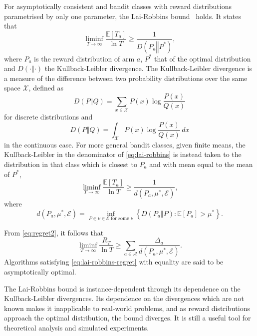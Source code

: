 For asymptotically consistent and bandit classes with reward distributions parametrised by only one parameter, the Lai-Robbins bound~\autocite{lai1985} holds.
It states that
\begin{equation}
    \liminf_{T\to\infty} \frac{\mathbb{E}[T_a]}{\ln T} \geq \frac{1}{D(P_a \mathrel{\Vert} P^*)},
    \label{eq:lai-robbins-times}
\end{equation}
where $P_a$ is the reward distribution of arm $a$, $P^*$ that of the optimal distribution and $D(\cdot \mathrel{\Vert} \cdot)$ the Kullback-Leibler divergence.
The Kullback-Leibler divergence is a measure of the difference between two probability distributions over the same space $\mathcal{X}$, defined as
\begin{equation}
    D(P \mathrel{\Vert} Q) = \sum_{x \in \mathcal{X}} P(x) \log \frac{P(x)}{Q(x)}
\end{equation}
for discrete distributions and
\begin{equation}
    D(P \mathrel{\Vert} Q) = \int_{\mathcal{X}} P(x) \log \frac{P(x)}{Q(x)} \, dx
\end{equation}
in the continuous case.
For more general bandit classes, given finite means, the Kullback-Leibler in the denominator of \cref{eq:lai-robbins} is instead taken to the distribution in that class which is closest to $P_a$ and with mean equal to the mean of $P^*$,
\begin{equation}
    \liminf_{T\to\infty} \frac{\mathbb{E}[T_a]}{\ln T} \geq \frac{1}{d(P_a, \mu^*, \mathcal{E})},
    \label{eq:lai-robbins}
\end{equation}
where
\begin{equation}
    d(P_a, \mu^*, \mathcal{E}) =
    \inf_{P \in \nu \in \mathcal{E} \text{ for some } \nu}
    \left\{ D(P_a \mathrel{\Vert} P): \mathbb{E}[P_a] > \mu^* \right\}.
\end{equation}


From \cref{eq:regret2}, it follows that
\begin{equation}
    \liminf_{T\to\infty} \frac{R_T}{\ln T}
    \geq
    \sum_{a \in \mathcal{A}}\frac{\Delta_a}{d(P_a, \mu^*, \mathcal{E})}.
    \label{eq:lai-robbins-regret}
\end{equation}
Algorithms satisfying \cref{eq:lai-robbins-regret} with equality are said to be asymptotically optimal.

The Lai-Robbins bound is instance-dependent through its dependence on the Kullback-Leibler divergences.
Its dependence on the divergences which are not known makes it inapplicable to real-world problems,
and as reward distributions approach the optimal distribution, the bound diverges.
It is still a useful tool for theoretical analysis and simulated experiments.



